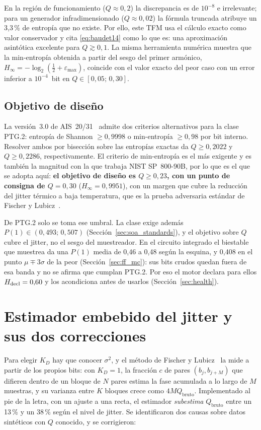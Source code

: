 En la región de funcionamiento ($Q\approx0{,}2$) la discrepancia es de
$10^{-8}$ e irrelevante; para un generador infradimensionado
($Q\approx0{,}02$) la fórmula truncada atribuye un 3,3\,\% de entropía que
no existe. Por ello, este TFM usa el cálculo exacto como valor conservador
y cita \eqref{eq:baudet14} como lo que es: una aproximación asintótica
excelente para $Q \gtrsim 0{,}1$. La misma herramienta numérica muestra que
la min-entropía obtenida a partir del sesgo del primer armónico,
$H_\infty = -\log_2(\tfrac12 + \varepsilon_{\max})$, coincide con el valor
exacto del peor caso con un error inferior a $10^{-4}$~bit en
$Q\in[0{,}05;\,0{,}30]$.

\subsection{Objetivo de diseño}

La versión~3.0 de AIS~20/31~\cite{peter_2024_ais31} admite dos criterios
alternativos para la clase PTG.2: entropía de Shannon $\ge 0{,}9998$ o
min-entropía $\ge 0{,}98$ por bit interno. Resolver ambos por bisección
sobre las entropías exactas da $Q \ge 0{,}2022$ y $Q \ge 0{,}2286$,
respectivamente. El criterio de min-entropía es el más exigente y es
también la magnitud con la que trabaja NIST SP~800-90B, por lo que es el
que se adopta aquí: \textbf{el objetivo de diseño es $Q \ge 0{,}23$, con
un punto de consigna de $Q = 0{,}30$} ($H_\infty = 0{,}9951$), con un
margen que cubre la reducción del jitter térmico a baja temperatura, que
es la prueba adversaria estándar de Fischer y
Lubicz~\cite{fischer_2014_embedded}.

De PTG.2 solo se toma ese umbral. La clase exige además
$P(1)\in(0{,}493;\,0{,}507)$ (Sección~\ref{sec:soa_standards}), y el
objetivo sobre $Q$ cubre el jitter, no el sesgo del muestreador. En el
circuito integrado el biestable que muestrea da una $P(1)$ media de 0,46
a 0,48 según la esquina, y 0,408 en el punto $\mu \mp 3\sigma$ de la
peor \simu{} (Sección~\ref{sec:ff_mc}): sus bits crudos quedan fuera de
esa banda y no se afirma que cumplan PTG.2. Por eso el motor declara para
ellos $H_{\mathrm{decl}} = 0{,}60$ y los acondiciona antes de usarlos
(Sección~\ref{sec:health}).

\section{Estimador embebido del jitter y sus dos correcciones}
\label{sec:estimator}

Para elegir $K_D$ hay que conocer $\sigma^2$, y el método de Fischer y
Lubicz~\cite{fischer_2014_embedded} la mide a partir de los propios bits:
con $K_D = 1$, la fracción $c$ de pares $(b_j, b_{j+M})$ que difieren
dentro de un bloque de $N$ pares estima la fase acumulada a lo largo de
$M$ muestras, y su varianza entre $K$ bloques crece como
$4 M Q_{\mathrm{bruto}}$. Implementado al pie de la letra, con un ajuste a
una recta, el estimador \emph{subestima} $Q_{\mathrm{bruto}}$ entre un
13\,\% y un 38\,\% según el nivel de jitter. Se identificaron dos causas
sobre datos sintéticos con $Q$ conocido, y se corrigieron:

